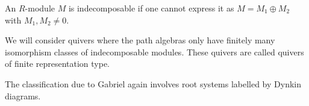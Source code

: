 An $R$-module $M$ is indecomposable if one cannot express it as
$M = M_1\oplus M_2$ with $M_1, M_2\neq 0$.

We will consider quivers where the path algebras only have finitely many
isomorphism classes of indecomposable modules. These quivers are called
quivers of finite representation type.

The classification due to Gabriel again involves root systems labelled by
Dynkin diagrams.
